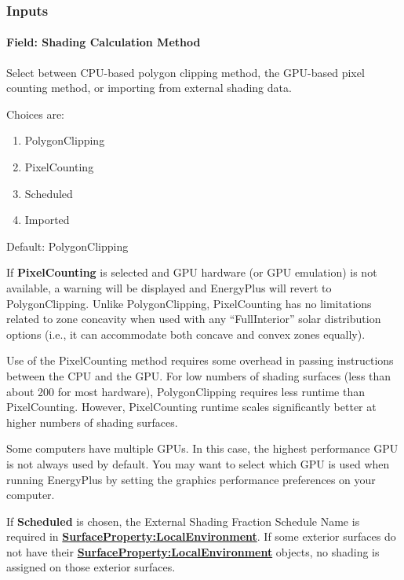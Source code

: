 \subsubsection{Inputs}\label{inputs-10-019}

\paragraph{Field: Shading Calculation Method}

Select between CPU-based polygon clipping method, the GPU-based pixel counting method, or importing from external shading data.

Choices are:
\begin{enumerate}
    \item PolygonClipping
    \item PixelCounting
    \item Scheduled
    \item Imported
\end{enumerate}

Default: PolygonClipping

If \textbf{PixelCounting} is selected and GPU hardware (or GPU emulation) is not available, a warning will be displayed and EnergyPlus will revert to PolygonClipping. Unlike PolygonClipping, PixelCounting has no limitations related to zone concavity when used with any ``FullInterior'' solar distribution options (i.e., it can accommodate both concave and convex zones equally).

Use of the PixelCounting method requires some overhead in passing instructions between the CPU and the GPU. For low numbers of shading surfaces (less than about 200 for most hardware), PolygonClipping requires less runtime than PixelCounting. However, PixelCounting runtime scales significantly better at higher numbers of shading surfaces.

Some computers have multiple GPUs. In this case, the highest performance GPU is not always used by default. You may want to select which GPU is used when running EnergyPlus by setting the graphics performance preferences on your computer.

If \textbf{Scheduled} is chosen, the External Shading Fraction Schedule Name is required in \textbf{\hyperref[surfacePropertylocalEnvironment]{SurfaceProperty:LocalEnvironment}}. If some exterior surfaces do not have their \textbf{\hyperref[surfacePropertylocalEnvironment]{SurfaceProperty:LocalEnvironment}} objects, no shading is assigned on those exterior surfaces.

